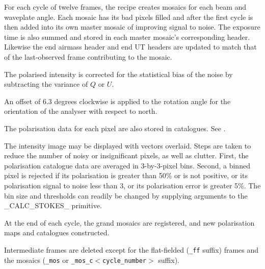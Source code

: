 \documentclass[twoside,11pt,nolof]{starlink}
\begin{document}
{{{         \sstitem
         For each cycle of twelve frames, the recipe creates mosaics
         for each beam and waveplate angle.  Each mosaic has its bad pixels
         filled and after the first cycle is then added into its own master
         mosaic of improving signal to noise.  The exposure time is also
         summed and stored in each master mosaic's corresponding
	 header.  Likewise the end airmass header and end UT headers
	 are updated to match that of the last-observed frame
	 contributing to the mosaic.

         \sstitem
         The polarised intensity is corrected for the statistical bias
         of the noise by subtracting the variance of $Q$ or $U$.

         \sstitem
         An offset of 6.3 degrees clockwise is applied to the rotation
         angle for the orientation of the analyser with respect to north.

         \sstitem
         The polarisation data for each pixel are also stored in
         catalogues.  See .

         \sstitem
         The intensity image may be displayed with vectors overlaid.
         Steps are taken to reduce the number of noisy or insignificant
         pixels, as well as clutter.  First, the polarisation catalogue data
         are averaged in 3-by-3-pixel bins.  Second, a binned pixel is
         rejected if its polarisation is greater than 50\% or is not positive,
         or its polarisation signal to noise less than 3, or its polarisation
         error is greater 5\%.  The bin size and thresholds can readily be
         changed by supplying arguments to the \_CALC\_STOKES\_ primitive.

         \sstitem
         At the end of each cycle, the grand mosaics are registered, and
         new polarisation maps and catalogues constructed.

         \sstitem
         Intermediate frames are deleted except for the flat-fielded ({\tt\_ff}
         suffix) frames and the mosaics ({\tt\_mos} or
         {\tt\_mos\_c$<$cycle\_number$>$} suffix).
      }
   }
   \label{pj_data}
   }
\end{document}
